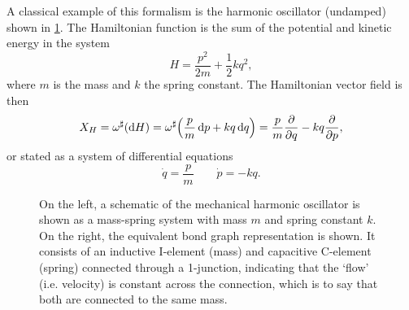 A classical example of this formalism is the harmonic oscillator (undamped) shown in \cref{fig:ho}. The Hamiltonian function is the sum of the potential and kinetic energy in the system
\begin{equation}
     H = \frac{p^2}{2m} + \frac{1}{2}kq^2,
\end{equation}
where \(m\) is the mass and \(k\) the spring constant. The Hamiltonian vector field is then 
\begin{equation}
     X_H = \omega^\sharp\qty(\dd{H}) = \omega^\sharp\qty(\frac{p}{m}\dd{p} + kq\dd{q}) = \frac{p}{m}\pdv{}{q} - kq \pdv{}{p},
\end{equation}
or stated as a system of differential equations
\begin{equation}
     \dot{q} = \frac{p}{m} \qquad \dot{p} = -kq.
\end{equation}
\begin{figure}[ht]
    \centering
    
    \caption{On the left, a schematic of the mechanical harmonic oscillator is shown as a mass-spring system with mass \(m\) and spring constant \(k\). On the right, the equivalent bond graph representation is shown. It consists of an inductive I-element (mass) and capacitive C-element (spring) connected through a 1-junction, indicating that the `flow' (i.e. velocity) is constant across the connection, which is to say that both are connected to the same mass.}
    \label{fig:ho}
\end{figure}

